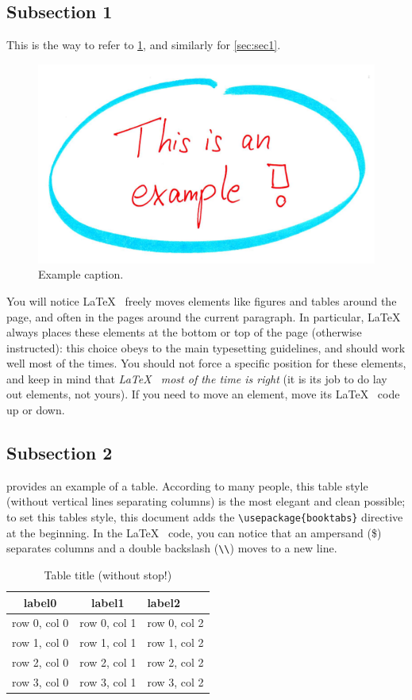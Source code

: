 \documentclass[12pt,oneside,a4paper]{article}
\begin{document}
\subsection{Subsection 1} \label{sec:sub1}
This is the way to refer to \cref{fig:example}, and similarly for \cref{sec:sec1}.
\begin{figure}
	\centering
	\includegraphics[width=.7\textwidth]{example.jpg}
	\caption{Example caption.}
	\label{fig:example}
\end{figure}
You will notice \LaTeX~ freely moves elements like figures and tables around the page, and often in the pages around the current paragraph. In particular, \LaTeX~ always places these elements at the bottom or top of the page (otherwise instructed): this choice obeys to the main typesetting guidelines, and should work well most of the times. You should not force a specific position for these elements, and keep in mind that \textit{\LaTeX~ most of the time is right} (it is its job to do lay out elements, not yours). If you need to move an element, move its \LaTeX~ code up or down.

\subsection{Subsection 2} \label{sec:sub2}
 provides an example of a table. According to many people, this table style (without vertical lines separating columns) is the most elegant and clean possible; to set this tables style, this document adds the \verb|\usepackage{booktabs}| directive at the beginning. In the \LaTeX~ code, you can notice that an ampersand (\$) separates columns and a double backslash (\verb|\\|) moves to a new line.
\begin{table}
	\caption{Table title (without stop!)}
	\centering
	\begin{tabular}{ccl}
		\toprule
		\textbf{label0} & \textbf{label1} & \textbf{label2} \\
		\midrule
		row 0, col 0 & row 0, col 1 & row 0, col 2 \\
		row 1, col 0 & row 1, col 1 & row 1, col 2 \\ 
		row 2, col 0 & row 2, col 1 & row 2, col 2 \\ 
		row 3, col 0 & row 3, col 1 & row 3, col 2 \\
		\bottomrule
	\end{tabular}
	\label{tab:example}
\end{table}
\end{document}
